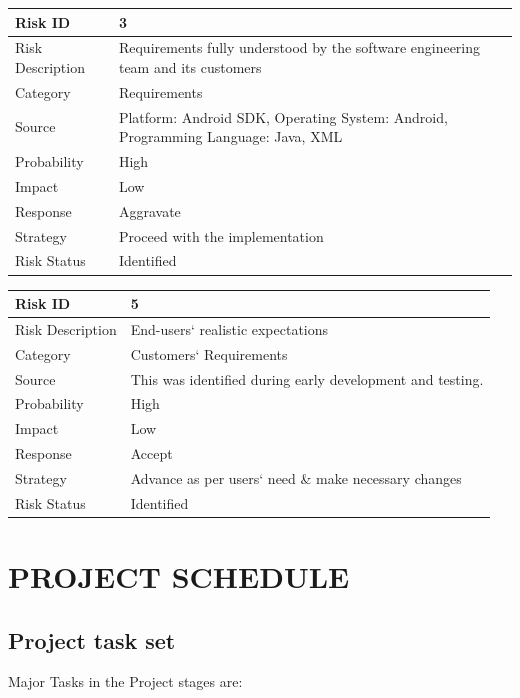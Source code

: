 \documentclass[12pt,a4paper]{report}
\begin{document}
\begin{table}[!h]
	\center
	 \begin{tabular}{|p{3.5cm}|p{9cm}|}
			\hline 
			Risk ID	& 3 \\ \hline
			Risk Description	& Requirements fully understood by the software engineering team and its customers \\ \hline
			Category	& Requirements \\ \hline
			Source	& Platform: Android SDK, \newline Operating System: Android, \newline Programming Language: Java, XML \\ \hline
			Probability	& High \\ \hline
			Impact	& Low \\ \hline
			Response	& Aggravate \\ \hline
			Strategy	& Proceed with the implementation  \\ \hline
			Risk Status	& Identified \\ \hline
		\end{tabular}
\end{table}

\begin{table}[!h]
	\center
		\begin{tabular}{|p{3.5cm}|p{9cm}|}
			\hline 
			Risk ID	& 5 \\ \hline
			Risk Description	& End-users` realistic expectations \\ \hline
			Category	& Customers` Requirements \\ \hline
			Source	& This was identified during early development and testing. \\ \hline
			Probability	& High \\ \hline
			Impact	& Low \\ \hline
			Response	& Accept \\ \hline
			Strategy	& Advance as per users` need \& make necessary changes  \\ \hline
			Risk Status	& Identified \\ \hline
		\end{tabular}
\end{table}

\newpage
\section{PROJECT SCHEDULE}

\subsection{Project task set}
Major Tasks in the Project stages are: 
\end{document}

